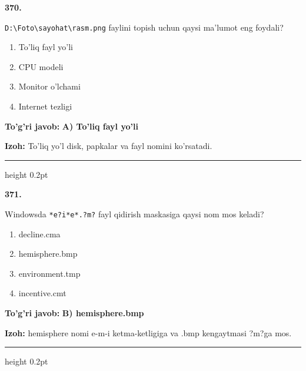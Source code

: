 \documentclass[10pt,a4paper]{article}
\begin{document}
{\bfseries\sffamily\color{ink} 370.}
\par
\texttt{D:\textbackslash{}Foto\textbackslash{}sayohat\textbackslash{}rasm.png} faylini topish uchun qaysi ma'lumot eng foydali?
\begin{enumerate}[label=\Alph*),leftmargin=9mm]
\item To'liq fayl yo'li
\item CPU modeli
\item Monitor o'lchami
\item Internet tezligi
\end{enumerate}
\begin{tcolorbox}[enhanced,breakable,colback=teal!4,colframe=teal!60!black,boxrule=0.45pt,arc=1.2mm,left=2.7mm,right=2.7mm,top=1.8mm,bottom=1.8mm,before skip=2mm,after skip=2mm]
{\bfseries\sffamily\color{teal}To'g'ri javob:} \textbf{A) To'liq fayl yo'li}
\par\smallskip
{\bfseries Izoh:} To'liq yo'l disk, papkalar va fayl nomini ko'rsatadi.
\end{tcolorbox}
\vspace{2mm}\hrule height 0.2pt\vspace{3mm}

{\bfseries\sffamily\color{ink} 371.}
\par
Windowsda \texttt{*e?i*e*.?m?} fayl qidirish maskasiga qaysi nom mos keladi?
\begin{enumerate}[label=\Alph*),leftmargin=9mm]
\item decline.cma
\item hemisphere.bmp
\item environment.tmp
\item incentive.cmt
\end{enumerate}
\begin{tcolorbox}[enhanced,breakable,colback=teal!4,colframe=teal!60!black,boxrule=0.45pt,arc=1.2mm,left=2.7mm,right=2.7mm,top=1.8mm,bottom=1.8mm,before skip=2mm,after skip=2mm]
{\bfseries\sffamily\color{teal}To'g'ri javob:} \textbf{B) hemisphere.bmp}
\par\smallskip
{\bfseries Izoh:} hemisphere nomi e-m-i ketma-ketligiga va .bmp kengaytmasi ?m?ga mos.
\end{tcolorbox}
\vspace{2mm}\hrule height 0.2pt\vspace{3mm}
\end{document}
